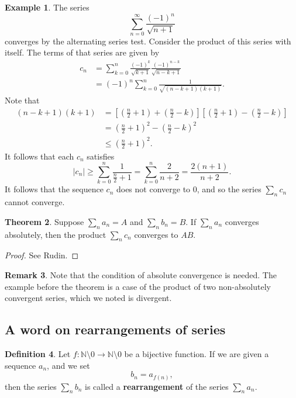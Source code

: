 \documentclass[12pt]{article}
\theoremstyle{definition}
\newtheorem{definition}{Definition}
\newtheorem{example}[definition]{Example}
\newtheorem{remark}[definition]{Remark}
\theoremstyle{theorem}
\newtheorem{theorem}[definition]{Theorem}
\begin{document}
\begin{example}
The series 
\[
\sum_{n=0}^\infty \frac{(-1)^n}{\sqrt{n+1}}
\]
converges by the alternating series test. Consider the product of this series with itself. The terms of that series are given by 
\begin{align*}
c_n &= \sum_{k=0}^n \frac{(-1)^k}{\sqrt{k+1}} \frac{(-1)^{n-k}}{\sqrt{n-k+1}} \\
&= (-1)^n \sum_{k=0}^n \frac{1}{\sqrt{(n-k+1)(k+1)}}.
\end{align*}
Note that 
\begin{align*}
(n-k+1)(k+1) &= \left[\left(\frac{n}{2} + 1\right) + \left(\frac{n}{2} - k\right) \right]\left[\left(\frac{n}{2} + 1\right) - \left(\frac{n}{2} - k\right)\right] \\
&= \left(\frac{n}{2} + 1\right)^2 - \left(\frac{n}{2} - k\right)^2 \\
&\leqslant \left(\frac{n}{2} + 1\right)^2.
\end{align*}
It follows that each $c_n$ satisfies 
\[
|c_n| \geqslant \sum_{k=0}^n \frac{1}{\frac{n}{2} + 1} = \sum_{k=0}^n \frac{2}{n+2} = \frac{2(n+1)}{n+2}.
\]
It follows that the sequence $c_n$ does not converge to $0$, and so the series $\sum_n c_n$ cannot converge. 
\end{example}

\begin{theorem}
Suppose $\sum_n a_n = A$ and $\sum_n b_n = B$. If $\sum_n a_n$ converges absolutely, then the product $\sum_n c_n$ converges to $AB$. 
\end{theorem}

\begin{proof}
See Rudin. 
\end{proof}

\begin{remark}
Note that the condition of absolute convergence is needed. The example before the theorem is a case of the product of two non-absolutely convergent series, which we noted is divergent. 
\end{remark}



\subsection{A word on rearrangements of series}

\begin{definition}
Let $f : \mathbb{N}\setminus 0 \to \mathbb{N} \setminus 0$ be a bijective function. If we are given a sequence $a_n$, and we set 
\[
b_n = a_{f(n)},
\]
then the series $\sum_n b_n$ is called a \textbf{rearrangement} of the series $\sum_n a_n$. 
\end{definition}
\end{document}
